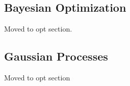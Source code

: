 
\vspace{10pt}
\subsection{Bayesian Optimization}
\label{sec:BO}
Moved to opt section.

\subsection{Gaussian Processes}
\label{sec:GPs}
Moved to opt section